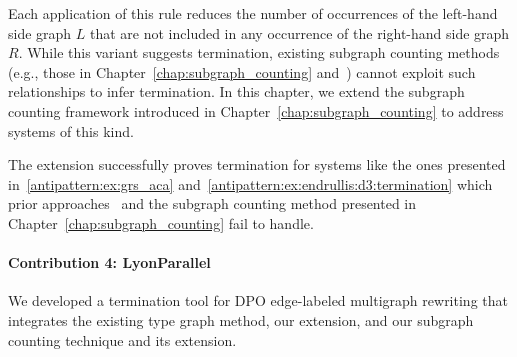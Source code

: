  
Each application of this rule reduces the number of occurrences of the left-hand side graph $L$ that are not included in any occurrence of the right-hand side graph $ R $. While this variant suggests termination, existing subgraph counting methods (e.g., those in Chapter~\ref{chap:subgraph_counting} and~\cite{overbeek2024termination_lmcs}) cannot exploit such relationships to infer termination. In this chapter, we extend the subgraph counting framework introduced in Chapter~\ref{chap:subgraph_counting} to address systems of this kind.

The extension successfully proves termination for systems like the ones presented in~\autoref{antipattern:ex:grs_aca} and~\autoref{antipattern:ex:endrullis:d3:termination} which prior approaches~\cite{zantema2014termination,bruggink2014termination,bruggink2015proving,endrullis2024generalized_arxiv_v2,overbeek2024termination_lmcs} and the subgraph counting method presented in Chapter~\ref{chap:subgraph_counting} fail to handle. 

\paragraph{Contribution 4: LyonParallel}
We developed a termination tool for DPO edge-labeled multigraph rewriting that integrates the existing type graph method, our extension, and our subgraph counting technique and its extension.